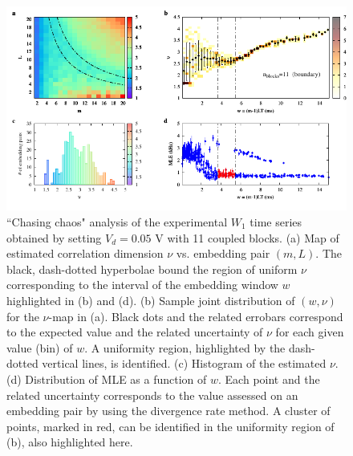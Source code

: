 \begin{figure}[H]
    \centering
    \includegraphics[width=\linewidth]{../blocks/11_blocks/edge/2e5_points/plots/chaos_low.pdf}
    \caption{``Chasing chaos" analysis of the experimental $W_1$ time series obtained by setting $V_d=0.05$ V with 11 coupled blocks.
    (a) Map of estimated correlation dimension $\nu$ vs. embedding pair $(m, L)$.
    The black, dash-dotted hyperbolae bound the region of uniform $\nu$ corresponding to the interval of the
    embedding window $w$ highlighted in (b) and (d).
    (b) Sample joint distribution of $(w,\nu)$ for the $\nu$-map in (a).
    Black dots and the related errobars correspond to the expected value and the related uncertainty of $\nu$
    for each given value (bin) of $w$. A uniformity region, highlighted by the dash-dotted vertical lines,
    is identified. (c) Histogram of the estimated $\nu$. (d) Distribution of MLE as a function of $w$. Each point and the related
    uncertainty corresponds to the value assessed on an embedding pair by using the divergence rate method.
    A cluster of points, marked in red, can be identified in the uniformity region of (b), also highlighted here.}
    \label{fig:11 blocks chaos}
\end{figure}

